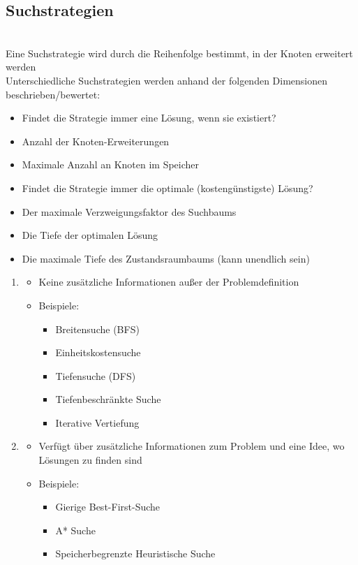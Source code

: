 \subsection{Suchstrategien}
\\
Eine Suchstrategie wird durch die Reihenfolge bestimmt, in der Knoten erweitert werden\\
Unterschiedliche Suchstrategien werden anhand der folgenden Dimensionen beschrieben/bewertet:
\begin{itemize}
    \item {} Findet die Strategie immer eine Lösung, wenn sie existiert?
    \item {} Anzahl der Knoten-Erweiterungen
    \item {} Maximale Anzahl an Knoten im Speicher
    \item {} Findet die Strategie immer die optimale (kostengünstigste) Lösung?
\end{itemize}
\begin{itemize}
    \item {} Der maximale Verzweigungsfaktor des Suchbaums
    \item {} Die Tiefe der optimalen Lösung
    \item {} Die maximale Tiefe des Zustandsraumbaums (kann unendlich sein)
\end{itemize}
\begin{enumerate}
    \item {}
    \begin{itemize}
        \item Keine zusätzliche Informationen außer der Problemdefinition
        \item Beispiele:
        \begin{itemize}
            \item Breitensuche (BFS)
            \item Einheitskostensuche
            \item Tiefensuche (DFS)
            \item Tiefenbeschränkte Suche
            \item Iterative Vertiefung
        \end{itemize}
    \end{itemize}
    \item {}
    \begin{itemize}
        \item Verfügt über zusätzliche Informationen zum Problem und eine Idee, wo Lösungen zu finden sind
        \item Beispiele:
        \begin{itemize}
            \item Gierige Best-First-Suche
            \item A* Suche
            \item Speicherbegrenzte Heuristische Suche
        \end{itemize}
    \end{itemize}
\end{enumerate}
